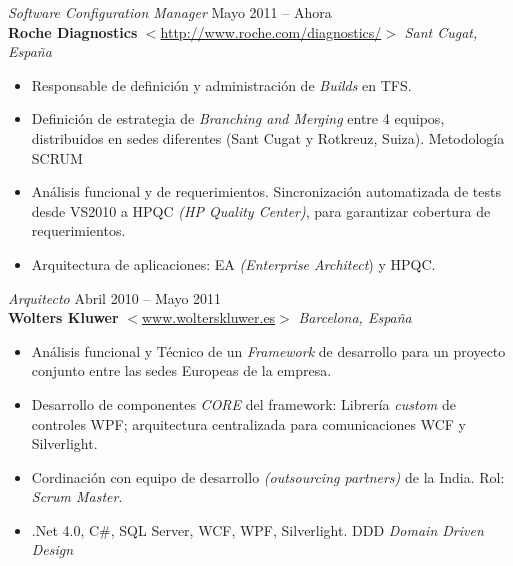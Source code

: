 \documentclass[line,margin]{res}
\begin{document}
\begin{resume}
{\sl Software Configuration Manager} \hfill Mayo 2011 -- Ahora \\
                \textbf{Roche Diagnostics} 
                $<$\url{http://www.roche.com/diagnostics/}$>$ \hfill \textit{Sant Cugat, Espa\~{n}a}
                \begin{itemize}  \itemsep 2pt %
                \item Responsable de definici\'{o}n y administraci\'{o}n de \textit{Builds} en TFS.
                \item Definici\'{o}n de estrategia de \textit{Branching and Merging} entre 4 equipos,
                distribuidos en sedes diferentes (Sant Cugat y Rotkreuz, Suiza). Metodolog\'{i}a SCRUM
                \item An\'{a}lisis funcional y de requerimientos. Sincronizaci\'{o}n automatizada de tests desde VS2010 
                a HPQC \textit{(HP Quality Center)}, para garantizar cobertura de requerimientos.
                \item Arquitectura de aplicaciones: EA \textit{(Enterprise Architect}) y HPQC.
                \end{itemize}


				{\sl Arquitecto} \hfill Abril 2010 -- Mayo 2011 \\
                \textbf{Wolters Kluwer} 
                $<$\url{www.wolterskluwer.es}$>$ \hfill \textit{Barcelona, Espa\~{n}a}
                \begin{itemize}  \itemsep 2pt %
                \item An\'{a}lisis funcional y T\'{e}cnico de un \textit{Framework} de desarrollo 
                para un proyecto conjunto entre las sedes Europeas de la empresa.
                \item Desarrollo de componentes \textit{CORE} del framework: Librer\'{i}a \textit{custom}
                de controles WPF; arquitectura centralizada para comunicaciones WCF y Silverlight.
                \item Cordinaci\'{o}n con equipo de desarrollo \textit{(outsourcing partners)} 
                de la India. Rol: \textit{Scrum Master}.
                \item .Net 4.0, C{\#}, SQL Server, WCF, WPF, Silverlight. DDD \textit{Domain Driven Design}
                \\
                \end{itemize}
                

\end{resume}
\end{document}
